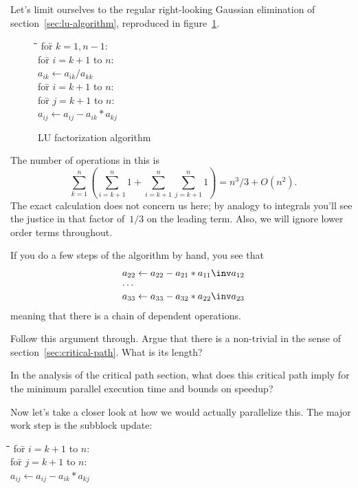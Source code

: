 Let's limit ourselves to the 
regular right-looking Gaussian elimination
of section~\ref{sec:lu-algorithm},
reproduced in figure~\ref{eq:LU-algorithm-again}.

\begin{figure}[t]
  \begin{tabbing}
    \kern10pt\=\kern10pt\=\kern10pt\=\kill
    for\={} $k=1,n-1$:\\
    \>for\={} $i=k+1$ to $n$:\\
    \>\> $a_{ik}\leftarrow a_{ik}/a_{kk}$\\
    \>for\={} $i=k+1$ to $n$:\\
    \>\>for\={} $j=k+1$ to $n$:\\
    \>\>\>$a_{ij}\leftarrow a_{ij}-a_{ik}*a_{kj}$
  \end{tabbing}
    \label{eq:LU-algorithm-again}
    \caption{LU factorization algorithm}
\end{figure}

The number of operations in this is
\[ \sum_{k=1}^n (\sum_{i=k+1}^n 1 + \sum_{i=k+1}^n\sum_{j=k+1}^n 1 ) =n^3/3 +O(n^2). \]
The exact calculation does not concern us here;
by analogy to integrals you'll see the justice in that factor of~$1/3$
on the leading term.
Also, we will ignore lower order terms throughout.

If you do a few steps of the algorithm by hand,
you see that
\[ 
\begin{array}{l}
  a_{22} \leftarrow a_{22} - a_{21}*a_{11}\inv a_{12}\\
  \cdots\\
  a_{33} \leftarrow a_{33} - a_{32}*a_{22}\inv a_{23}\\
\end{array}
\]
meaning that there is a chain of dependent operations.

\begin{exercise}
  \label{ex:gauss-critical}
  Follow this argument through.
  Argue that there is a non-trivial 
  in the sense of section~\ref{sec:critical-path}.
  What is its length?

  In the analysis of the critical path section,
  what does this critical path imply for the
  minimum parallel execution time and bounds on speedup?
\end{exercise}

Now let's take a closer look at how we would actually parallelize this.
The major work step is the subblock update:

\begin{tabbing}
  \kern20pt\=\kern10pt\=\kern10pt\=\kern10pt\=\kill
  for\={} $i=k+1$ to $n$:\\
  \>for\={} $j=k+1$ to $n$:\\
  \>\>$a_{ij}\leftarrow a_{ij}-a_{ik}*a_{kj}$
\end{tabbing}

